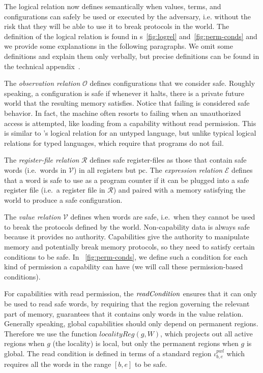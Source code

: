 \documentclass[compsoc,conference,letterpaper,fleqn]{IEEEtran}
\newcommand\dominique[1]{{\color{purple} \sf \footnotesize {DD: #1}}\\}
\renewcommand\dominique[1]{}
\newcommand{\var}[1]{\mathit{#1}}
\newcommand{\gl}{\var{g}}
\newcommand{\pcreg}{\mathrm{pc}}
\newcommand{\start}{\var{b}}
\newcommand{\addrend}{\var{e}}
\newcommand{\pwl}{\var{pwl}}
\newcommand{\plainfun}[2]{
  \ifthenelse{\equal{#2}{}}
  {\mathit{#1}}
  {\mathit{#1}(#2)}
}
\newcommand{\readCond}[1]{\plainfun{readCondition}{#1}}
\newcommand{\asmType}{\plaindom{AsmType}}
\newcommand{\plaindom}[1]{\mathrm{#1}}
\newcommand{\intr}[2]{\mathcal{#1}}
\newcommand{\valueintr}[1]{\intr{V}{#1}}
\newcommand{\exprintr}[1]{\intr{E}{#1}}
\newcommand{\regintr}[1]{\intr{R}{#1}}
\newcommand{\stdvr}{\valueintr{\asmType}}
\newcommand{\stder}{\exprintr{\asmType}}
\newcommand{\stdrr}{\regintr{\asmType}}
\newcommand{\observations}{\mathcal{O}}
\begin{document}
The logical relation now defines semantically when values, terms, and
configurations can safely be used or executed by the adversary, i.e. without the
risk that they will be able to use it to break protocols in the world. The
definition of the logical relation is found in \figurename{}s~\ref{fig:logrel}
and~\ref{fig:perm-conds} and we provide some explanations in the following
paragraphs. We omit some definitions and explain them only verbally, but precise
definitions can be found in the technical appendix~\citep{technical_appendix}.

The \emph{observation relation} $\observations$ defines configurations that we
consider safe. Roughly speaking, a configuration is safe if whenever it halts,
there is a private future world that the resulting memory satisfies. Notice that
failing is considered safe behavior. In fact, the machine often resorts to
failing when an unauthorized access is attempted, like loading from a capability
without read permission. This is similar to \citet{Devriese:2016ObjCap}'s logical
relation for an untyped language, but unlike typical logical relations
for typed languages, which require that programs do not fail.

The \emph{register-file relation} $\stdrr$ defines safe register-files as those
that contain safe words (i.e.\ words in $\stdvr$) in all registers but $\pcreg$.
The \emph{expression relation} $\stder$ defines that a word is safe to use as a
program counter if it can be plugged into a safe register file (i.e.\ a register
file in $\stdrr$) and paired with a memory satisfying the world to produce a
safe configuration.

The \emph{value relation} $\stdvr$ defines when words are safe, i.e.\ when they
cannot be used to break the protocols defined by the world. Non-capability data
is always safe because it provides no authority. Capabilities give the authority
to manipulate memory and potentially break memory protocols, so they need to
satisfy certain conditions to be safe. In \figurename~\ref{fig:perm-conds}, we
define such a condition for each kind of permission a capability can have (we
will call these permission-based conditions).

For capabilities with read permission, the $\readCond{}$ ensures that it can
only be used to read safe words, by requiring that the region governing the
relevant part of memory, guarantees that it contains only words in the value
relation. Generally speaking, global capabilities should only depend on
permanent regions. Therefore we use the function $\var{localityReg}(\gl,W)$,
which projects out all active regions when $\gl$ (the locality) is local, but
only the permanent regions when $\gl$ is global. The read condition is defined
in terms of a standard region $\iota^\pwl_{\start,\addrend}$ which requires all
the words in the range $[\start,\addrend]$ to be safe.
\end{document}
